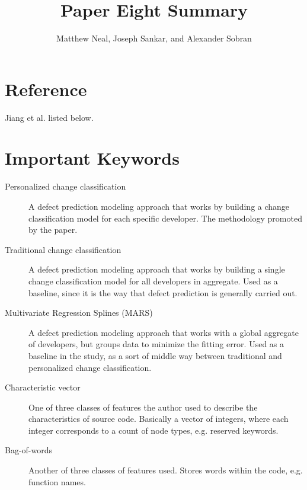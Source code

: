 \documentclass[english]{article}
\begin{document}
\title{Paper Eight Summary}


\author{Matthew Neal, Joseph Sankar, and Alexander Sobran}

\maketitle

\section*{Reference}

Jiang et al. \cite{Jiang} listed below.


\section*{Important Keywords}
\begin{description}
\item [{Personalized change classification}] A defect prediction modeling approach that works by building a change classification model for each specific developer.  The methodology promoted by the paper.
\item[{Traditional change classification}] A defect prediction modeling approach that works by building a single change classification model for all developers in aggregate.  Used as a baseline, since it is the way that defect prediction is generally carried out.
\item[{Multivariate Regression Splines (MARS)}] A defect prediction modeling approach that works with a global aggregate of developers, but groups data to minimize the fitting error.   Used as a baseline in the study, as a sort of middle way between traditional and personalized change classification.
\item[{Characteristic vector}]  One of three classes of features the author used to describe the characteristics of source code. Basically a vector of integers, where each integer corresponds to a count of node types, e.g. reserved keywords.
\item[{Bag-of-words}] Another of three classes of features used. Stores words within the code, e.g. function names.

\end{description}
\end{document}
